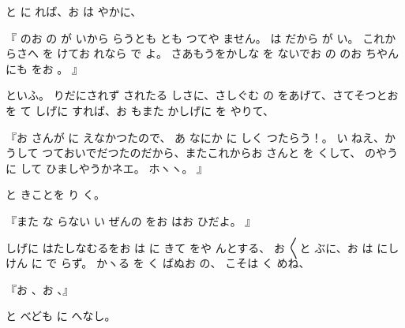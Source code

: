 と
に
れば、お
は
やかに、

『
のお
の
が
いから
らうとも
とも
つてや
ません。
は
だから
が
い。
これからさへ
を
けてお
れなら
で
よ。
さあもうをかしな
を
ないでお
の
のお
ちやんにも
をお
。
』

といふ。
りだにされず
されたる
しさに、さしぐむ
の
をあげて、さてそつとお
を
て
しげに
すれば、お
もまた
かしげに
を
やりて、

『お
さんが
に
えなかつたので、
あ
なにか
に
しく
つたらう！。
い
ねえ、かうして
つておいでだつたのだから、またこれからお
さんと
を
くして、
のやうに
して
ひましやうかネエ。
ホヽヽ。
』

と
きことを
り
く。

『また
な
らない
い
ぜんの
をお
はお
ひだよ。
』

しげに
はたしなむるをお
は
に
きて
をや
んとする、
お
〳〵と
ぶに、お
は
にしけん
に
で
らず。
かヽる
を
く
ばぬお
の、
こそは
く
めね、

『お
、お
、』

と
べども
に
へなし。

